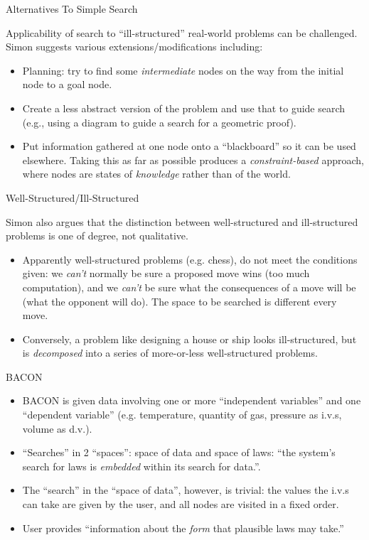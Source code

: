 \documentclass{article}
\begin{document}
\begin{slide}{}
{\Large Alternatives To Simple Search}

Applicability of search to ``ill-structured'' real-world problems
can be challenged. Simon suggests various extensions/modifications including:
\begin{itemize}
\item Planning: try to find some {\em intermediate} nodes on the way
from the initial node to a goal node.
\item Create a less abstract version of the problem and use that
to guide search (e.g., using a diagram to guide a search for a
geometric proof).
\item Put information gathered at one node onto a ``blackboard'' so it
can be used elsewhere. Taking this as far as possible produces a {\em
constraint-based} approach, where nodes are states of {\em
knowledge} rather than of the world. 
\end{itemize}
\end{slide}

\begin{slide}{}
{\Large Well-Structured/Ill-Structured}

Simon also argues that the distinction between well-structured and
ill-structured problems is one of degree, not qualitative.
\begin{itemize}
\item Apparently well-structured problems (e.g. chess), do not meet
the conditions given: we {\em can't}
normally be sure a proposed move wins (too much computation), and we
{\em can't} be sure what the consequences of a move will be (what the
opponent will do). The space to be searched is different every move.
\item Conversely, a problem like designing a house or ship looks
ill-structured, but is {\em decomposed} into a series of more-or-less
well-structured problems.
\end{itemize}
\end{slide}

\begin{slide}{}
{\Large BACON}
\begin{itemize}
\item BACON is given data involving one or more ``independent
variables'' and one ``dependent variable'' (e.g. temperature, quantity
of gas, pressure as i.v.s, volume as d.v.).
\item ``Searches'' in 2 ``spaces'': space of data and space of laws:
``the system's search for laws is {\em embedded} within its 
search for data.''. 
\item The ``search'' in the ``space of data'', however, is trivial:
the values the i.v.s can take are given by the user, and all
nodes are visited in a fixed order.
\item User provides ``information about the {\em form} that plausible
laws may take.''
\end{itemize}
\end{slide}
\end{document}
